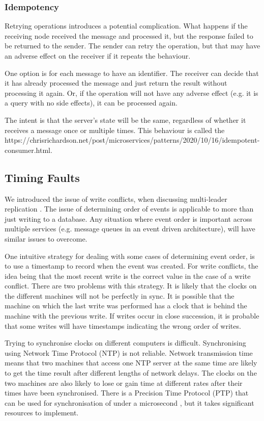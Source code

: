 \subsubsection{Idempotency}
Retrying operations introduces a potential complication.
What happens if the receiving node received the message and processed it, but the response failed to be returned to the sender.
The sender can retry the operation, but that may have an adverse effect on the receiver if it repeats the behaviour.

One option is for each message to have an identifier.
The receiver can decide that it has already processed the message and just return the result without processing it again.
Or, if the operation will not have any adverse effect (e.g. it is a query with no side effects), it can be processed again.

The intent is that the server's state will be the same, regardless of whether it receives a message once or multiple times.
This behaviour is called the 
{https://chrisrichardson.net/post/microservices/patterns/2020/10/16/idempotent-consumer.html}.

\subsection{Timing Faults}\label{timing}
We introduced the issue of write conflicts, when discussing multi-leader replication \cite{distributed2-notes}.
The issue of determining order of events is applicable to more than just writing to a database.
Any situation where event order is important across multiple services (e.g. message queues in an event driven architecture),
will have similar issues to overcome.

One intuitive strategy for dealing with some cases of determining event order,
is to use a timestamp to record when the event was created.
For write conflicts, the idea being that the most recent write is the correct value in the case of a write conflict.
There are two problems with this strategy.
It is likely that the clocks on the different machines will not be perfectly in sync.
It is possible that the machine on which the last write was performed has a clock that is behind the machine with the previous write.
If writes occur in close succession, it is probable that some writes will have timestamps indicating the wrong order of writes.

Trying to synchronise clocks on different computers is difficult.
Synchronising using Network Time Protocol (NTP) is not reliable.
Network transmission time means that two machines that access one NTP server at the same time
are likely to get the time result after different lengths of network delays.
The clocks on the two machines are also likely to lose or gain time at different rates after their times have been synchronised.
There is a Precision Time Protocol (PTP) that can be used for synchronisation of under a microsecond \cite{ieee-1588},
but it takes significant resources to implement.

